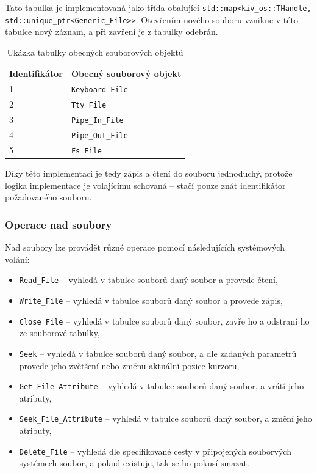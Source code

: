 \documentclass[12pt, a4paper]{article}
\begin{document}
Tato tabulka je implementovaná jako třída obalující \texttt{std::map<kiv\_os::THandle, std::unique\_ptr<Generic\_File>>}. Otevřením nového souboru vznikne v této tabulce nový záznam, a při zavření je z tabulky odebrán.

\begin{table}[ht]
\centering
\begin{tabular}{|l|l|}
\hline
\textbf{Identifikátor} & \textbf{Obecný souborový objekt} \\ \hline
1                      & \texttt{Keyboard\_File}                   \\ \hline
2                      & \texttt{Tty\_File}                        \\ \hline
3                      & \texttt{Pipe\_In\_File}                   \\ \hline
4                      & \texttt{Pipe\_Out\_File}                  \\ \hline
5                      & \texttt{Fs\_File}                         \\ \hline
\end{tabular}
\caption{Ukázka tabulky obecných souborových objektů}
\end{table}

Díky této implementaci je tedy zápis a čtení do souborů jednoduchý, protože logika implementace je volajícímu schovaná -- stačí pouze znát identifikátor požadovaného souboru.

\subsubsection{Operace nad soubory}
Nad soubory lze provádět různé operace pomocí následujících systémových volání:

\begin{itemize}
    \item \texttt{Read\_File} -- vyhledá v tabulce souborů daný soubor a provede čtení,
    \item \texttt{Write\_File} -- vyhledá v tabulce souborů daný soubor a provede zápis,
    \item \texttt{Close\_File} -- vyhledá v tabulce souborů daný soubor, zavře ho a odstraní ho ze souborové tabulky,
    \item \texttt{Seek} -- vyhledá v tabulce souborů daný soubor, a dle zadaných parametrů provede jeho zvětšení nebo změnu aktuální pozice kurzoru,
    \item \texttt{Get\_File\_Attribute} -- vyhledá v tabulce souborů daný soubor, a vrátí jeho atributy,
    \item \texttt{Seek\_File\_Attribute} -- vyhledá v tabulce souborů daný soubor, a změní jeho atributy, 
    \item \texttt{Delete\_File} -- vyhledá dle specifikované cesty v připojených souborvých systémech soubor, a pokud existuje, tak se ho pokusí smazat.
\end{itemize}
\end{document}
